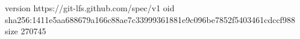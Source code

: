 version https://git-lfs.github.com/spec/v1
oid sha256:1411e5aa688679a166c88ae7c33999361881e9c096be7852f5403461cdccf988
size 270745
